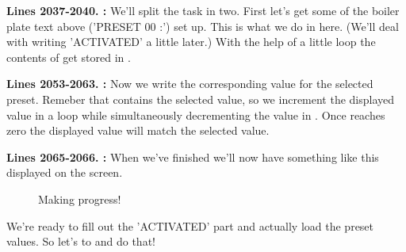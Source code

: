 \textbf{Lines 2037-2040. :} We'll split the task in two. First let's get some of the boiler plate text
above ('PRESET 00         :') set up. This is what we do in here. (We'll deal with writing 'ACTIVATED' a little later.) With the help of a little
loop the contents of  get stored in .

\textbf{Lines 2053-2063. :} Now we write the corresponding value for the selected preset. Remeber that
 contains the selected value, so we increment the displayed value in a loop while simultaneously decrementing the value in . Once
 reaches zero the displayed value will match the selected value.

\textbf{Lines 2065-2066. :} When we've finished we'll now have something like this displayed on the screen.
\begin{figure}[H]                                                          
  \centering                                                             
\caption{Making progress!}
\end{figure}                                                               

We're ready to fill out the 'ACTIVATED' part and actually load the preset values. So let's  to  and do that!

